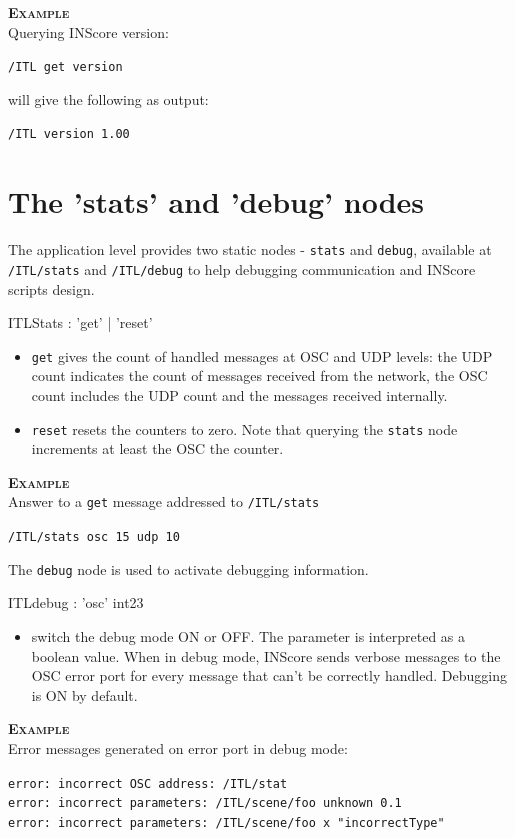 \documentclass[a4paper,twoside]{report}
\newcommand{\sublevel}[1]	{\section{#1}}
\newcommand{\OSC}[1]		{\texttt{#1}}
\newcommand{\example}		{\textbf{\hspace{-1.5cm}\textbf{\textsc{Example }}}}
\newcommand{\sample}	[1]			{\vspace{-2mm}\begin{center}\colorbox{mygrey}{
								\begin{minipage}[t]{0.9\columnwidth} 
								{\small \texttt{#1}}
								\end{minipage}}\end{center}}
\newcommand{\sampleindent}	{ \hspace{0.5cm} }
\begin{document}
\example \\
Querying INScore version:
\sample{/ITL get version}
\sampleindent will give the following as output:
\sample{/ITL version 1.00}

\sublevel{The 'stats' and 'debug' nodes}
\label{ITLdebug}

The application level provides two static nodes - \OSC{stats} and \OSC{debug}, available at \OSC{/ITL/stats} and \OSC{/ITL/debug} to help debugging communication and INScore scripts design.

\begin{rail}
ITLStats : 'get'  | 'reset'
\end{rail}

\begin{itemize}
\item \OSC{get} gives the count of handled messages at OSC and UDP levels: the UDP count indicates the count of messages received from the network, the OSC count includes the UDP count and the messages received internally.
\item \OSC{reset} resets the counters to zero. Note that querying the \OSC{stats} node increments at least the OSC the counter.
\end{itemize}

\example \\
Answer to a \OSC{get} message addressed to \OSC{/ITL/stats}
\sample{/ITL/stats osc 15 udp 10}

The \OSC{debug} node is used to activate debugging information.
\begin{rail}
ITLdebug : 'osc' int23
\end{rail}

\begin{itemize}
\item switch the debug mode ON or OFF. The parameter is interpreted as a boolean value. When in debug mode, INScore sends verbose messages to the OSC error port for every message that can't be correctly handled. Debugging is ON by default.
\end{itemize}

\example \\
Error messages generated on error port in debug mode:
\sample{error:  incorrect OSC address: /ITL/stat\\
error:  incorrect parameters: /ITL/scene/foo unknown 0.1\\
error:  incorrect parameters: /ITL/scene/foo x "incorrectType"
}
\end{document}
